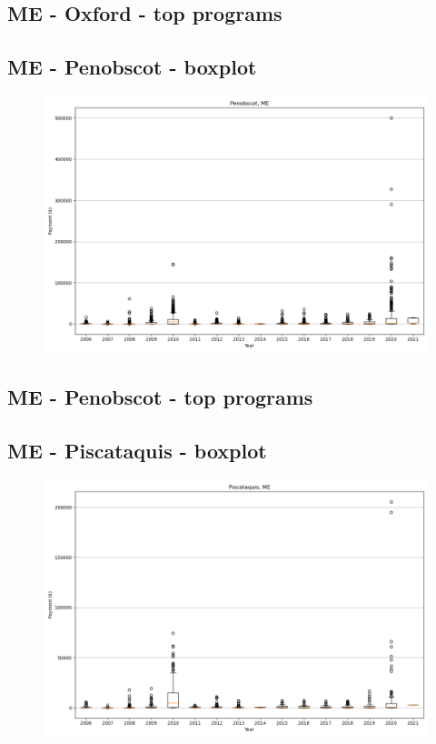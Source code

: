 \subsection*{ME - Oxford - top programs}

\newpage
\subsection*{ME - Penobscot - boxplot}
\begin{figure}[h]
\centering
\includegraphics[width=7in]{../output/boxplots/counties/Penobscot-ME_boxplot.png}
\end{figure}


\subsection*{ME - Penobscot - top programs}

\newpage
\subsection*{ME - Piscataquis - boxplot}
\begin{figure}[h]
\centering
\includegraphics[width=7in]{../output/boxplots/counties/Piscataquis-ME_boxplot.png}
\end{figure}


